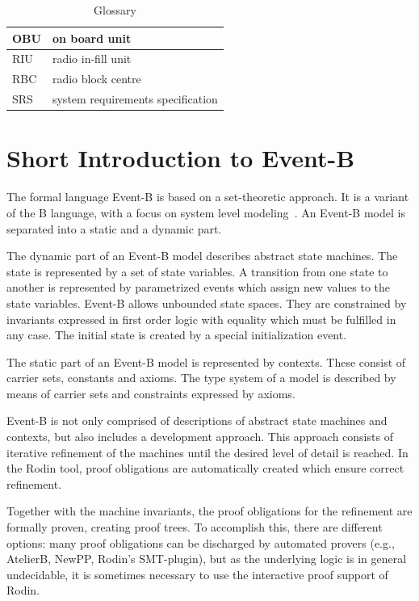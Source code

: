 \documentclass{template/openetcs_article}
\begin{document}
\begin{table}[ht]
  \centering
  \begin{tabular}[ht]{|l|l|}
    \hline
    OBU & on board unit \\
    \hline
    RIU & radio in-fill unit \\
    \hline
    RBC & radio block centre \\
    \hline
    SRS & system requirements specification \\
  \end{tabular}
  \caption{Glossary}
  \label{tab:glossary}
\end{table}

\section{Short Introduction to Event-B}
\label{sec:short-intr-event}

The formal language Event-B is based on a set-theoretic approach. It is a
variant of the B language, with a focus on system level
modeling~\cite{eventbbook}. An Event-B model is separated into a static and a
dynamic part.

The dynamic part of an Event-B model describes abstract state machines. The
state is represented by a set of state variables. A transition from one state to
another is represented by parametrized events which assign new values to the
state variables. Event-B allows unbounded state spaces. They are constrained by
invariants expressed in first order logic with equality which must be fulfilled
in any case. The initial state is created by a special initialization event.

The static part of an Event-B model is represented by contexts. These consist of
carrier sets, constants and axioms. The type system of a model is described by
means of carrier sets and constraints expressed by axioms.

Event-B is not only comprised of descriptions of abstract state machines and
contexts, but also includes a development approach. This approach consists of
iterative refinement of the machines until the desired level of detail is
reached. In the Rodin tool, proof obligations are automatically created which
ensure correct refinement.

Together with the machine invariants, the proof obligations for the refinement
are formally proven, creating proof trees. To accomplish this, there are
different options: many proof obligations can be discharged by automated provers
(e.g., AtelierB, NewPP, Rodin's SMT-plugin), but as the underlying logic is in
general undecidable, it is sometimes necessary to use the interactive proof
support of Rodin.
\end{document}
